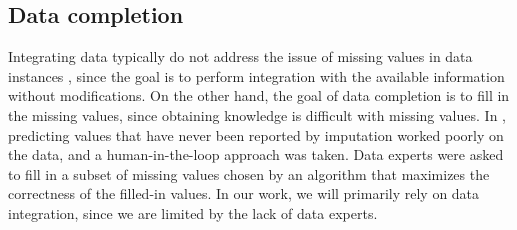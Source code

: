 \subsection{Data completion}

Integrating data typically do not address the issue of missing values in data instances \cite{Miller2018MakingOD}, since the goal is to perform integration with the available information without modifications. On the other hand, the goal of data completion is to fill in the missing values, since obtaining knowledge is difficult with missing values. In \cite{Wilkinson2016FAIR}, predicting values that have never been reported by imputation worked poorly on the data, and a human-in-the-loop approach was taken. Data experts were asked to fill in a subset of missing values chosen by an algorithm that maximizes the correctness of the filled-in values. In our work, we will primarily rely on data integration, since we are limited by the lack of data experts.
\endinput